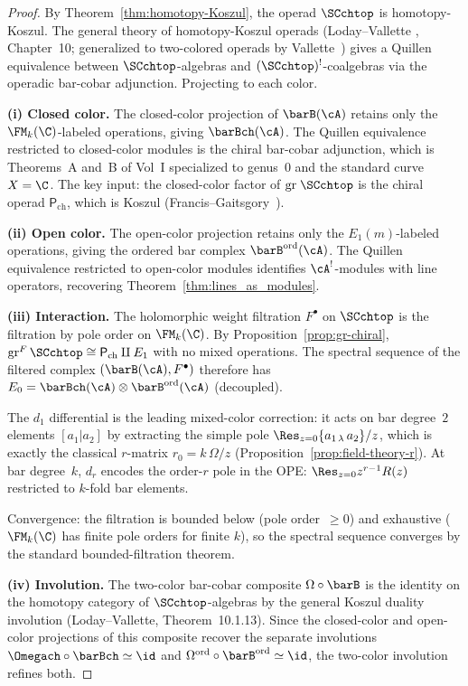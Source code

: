 \begin{proof}
By Theorem~\ref{thm:homotopy-Koszul}, the operad $\SCchtop$
is homotopy-Koszul. The general theory of homotopy-Koszul
operads (Loday--Vallette \cite{LV12}, Chapter~10; generalized
to two-colored operads by Vallette~\cite{Val07}) gives a Quillen
equivalence between $\SCchtop$-algebras and
$(\SCchtop)^!$-coalgebras via the operadic bar-cobar
adjunction. Projecting to each color.

\medskip
\noindent\textbf{(i) Closed color.}
The closed-color projection of $\barB(\cA)$ retains
only the $\FM_k(\C)$-labeled operations, giving $\barBch(\cA)$.
The Quillen equivalence restricted to closed-color modules is
the chiral bar-cobar adjunction, which is Theorems~A and~B
of Vol~I specialized to genus~$0$ and the standard curve
$X = \C$. The key input: the closed-color factor of
$\mathrm{gr}\;\SCchtop$ is the chiral operad
$\mathsf{P}_{\mathrm{ch}}$, which is Koszul
(Francis--Gaitsgory~\cite{FG12}).

\medskip
\noindent\textbf{(ii) Open color.}
The open-color projection retains only the
$E_1(m)$-labeled operations, giving the ordered bar complex
$\barB^{\mathrm{ord}}(\cA)$. The Quillen equivalence
restricted to open-color modules identifies
$\cA^!$-modules with line operators, recovering
Theorem~\ref{thm:lines_as_modules}.

\medskip
\noindent\textbf{(iii) Interaction.}
The holomorphic weight filtration $F^\bullet$ on $\SCchtop$ is
the filtration by pole order on $\FM_k(\C)$. By
Proposition~\ref{prop:gr-chiral},
$\mathrm{gr}^F\,\SCchtop \cong \mathsf{P}_{\mathrm{ch}}
\amalg E_1$ with no mixed operations. The spectral sequence of
the filtered complex $(\barB(\cA), F^\bullet)$
therefore has $E_0 = \barBch(\cA) \otimes
\barB^{\mathrm{ord}}(\cA)$ (decoupled).

The $d_1$ differential is the leading mixed-color correction:
it acts on bar degree~$2$ elements $[a_1 | a_2]$ by extracting
the simple pole $\Res_{z=0} \{a_{1\,\lambda}\, a_2\}/z$,
which is exactly the classical $r$-matrix $r_0 = k\,\Omega/z$
(Proposition~\ref{prop:field-theory-r}). At bar degree~$k$,
$d_r$ encodes the order-$r$ pole in the OPE:
$\Res_{z=0} z^{r-1} R(z)$ restricted to $k$-fold bar elements.

Convergence: the filtration is bounded below
(pole order~$\ge 0$) and exhaustive ($\FM_k(\C)$ has finite
pole orders for finite $k$), so the spectral sequence converges
by the standard bounded-filtration theorem.

\medskip
\noindent\textbf{(iv) Involution.}
The two-color bar-cobar composite
$\Omega \circ \barB$ is the identity on
the homotopy category of $\SCchtop$-algebras by the general
Koszul duality involution (Loday--Vallette, Theorem~10.1.13).
Since the closed-color and open-color projections of this
composite recover the separate involutions $\Omegach \circ
\barBch \simeq \id$ and
$\Omega^{\mathrm{ord}} \circ \barB^{\mathrm{ord}} \simeq
\id$, the two-color involution refines both.
\end{proof}

